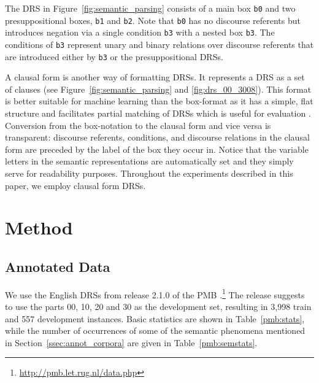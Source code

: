 \documentclass[11pt,a4paper]{article}
\newcommand{\ttboxlab}[1]{\texttt{#1}}
\begin{document}
The DRS in Figure~\ref{fig:semantic_parsing} consists of a main box \ttboxlab{b0} and two presuppositional boxes, \ttboxlab{b1} and \ttboxlab{b2}. Note that \ttboxlab{b0} has no discourse referents but introduces negation via a single condition \ttboxlab{b3} with a nested box \ttboxlab{b3}.
The conditions of \ttboxlab{b3} represent unary and binary relations over discourse referents that are introduced either by \ttboxlab{b3} or the presuppositional DRSs.

A clausal form is another way of formatting DRSs. 
It represents a DRS as a set of clauses (see Figure~\ref{fig:semantic_parsing} and \ref{fig:drs_00_3008}).
This format is better suitable for machine learning than the box-format as it has a simple, flat structure and facilitates partial matching of DRSs which is useful for evaluation \cite{pmb-LREC:18}.
Conversion from the box-notation to the clausal form and vice versa is transparent: discourse referents, conditions, and discourse relations in the clausal form are preceded by the label of the box they occur in.
Notice that the variable letters in the semantic representations are automatically set and they simply serve for readability purposes. 
Throughout the experiments described in this paper, we employ clausal form DRSs.  

\section{Method}
\label{sec:method}

\subsection{Annotated Data}
\label{ssec:data}

We use the English DRSs from release 2.1.0 of the PMB \cite{PMBshort:2017}.\footnote{\url{http://pmb.let.rug.nl/data.php}} 
The release suggests to use the parts 00, 10, 20 and 30 as the development set, resulting in 3,998 train and 557 development instances. 
Basic statistics are shown in Table~\ref{pmb:stats}, while the number of occurrences of some of the semantic phenomena mentioned in Section~\ref{ssec:annot_corpora} are given in Table~\ref{pmb:semstats}. 

\begin{table}[t]
\centering
{}
\caption{Number of documents, sentences and tokens for the English part of PMB release 2.1.0. Note that the number of tokens is based on the PMB tokenization, treating multi-word expressions as a single token.}
\label{pmb:stats}
\end{table}
\end{document}
